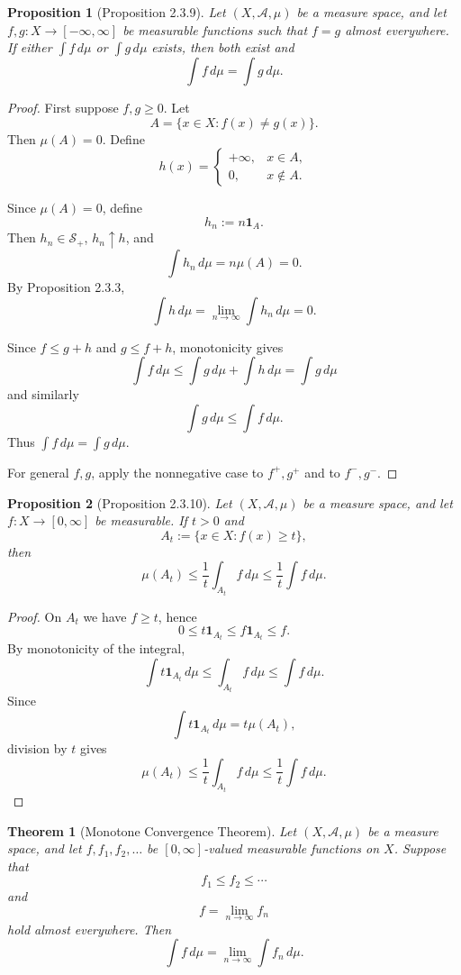 \documentclass[12pt]{article}
\newtheorem{theorem}{Theorem}
\newtheorem{proposition}{Proposition}
\begin{document}
\begin{proposition}[Proposition 2.3.9]
Let $(X,\mathcal{A},\mu)$ be a measure space, and let $f,g:X\to[-\infty,\infty]$
be measurable functions such that $f=g$ almost everywhere. If either
$\int f\,d\mu$ or $\int g\,d\mu$ exists, then both exist and
\[
\int f\,d\mu = \int g\,d\mu.
\]
\end{proposition}

\begin{proof}
First suppose $f,g\ge 0$. Let
\[
A=\{x\in X:f(x)\neq g(x)\}.
\]
Then $\mu(A)=0$. Define
\[
h(x)=
\begin{cases}
+\infty, & x\in A,\\
0, & x\notin A.
\end{cases}
\]

Since $\mu(A)=0$, define
\[
h_n := n\mathbf{1}_A.
\]
Then $h_n \in \mathcal{S}_+$, $h_n \uparrow h$, and
\[
\int h_n\,d\mu = n\mu(A)=0.
\]
By Proposition 2.3.3,
\[
\int h\,d\mu
=
\lim_{n\to\infty}\int h_n\,d\mu
=
0.
\]

Since $f\le g+h$ and $g\le f+h$, monotonicity gives
\[
\int f\,d\mu \le \int g\,d\mu+\int h\,d\mu=\int g\,d\mu
\]
and similarly
\[
\int g\,d\mu \le \int f\,d\mu.
\]
Thus $\int f\,d\mu=\int g\,d\mu$.

For general $f,g$, apply the nonnegative case to $f^+,g^+$ and to $f^-,g^-$.
\end{proof}

\begin{proposition}[Proposition 2.3.10]
Let $(X,\mathcal{A},\mu)$ be a measure space, and let
$f:X\to[0,\infty]$ be measurable. If $t>0$ and
\[
A_t:=\{x\in X:f(x)\ge t\},
\]
then
\[
\mu(A_t)
\le
\frac{1}{t}\int_{A_t} f\,d\mu
\le
\frac{1}{t}\int f\,d\mu.
\]
\end{proposition}

\begin{proof}
On $A_t$ we have $f\ge t$, hence
\[
0\le t\mathbf{1}_{A_t}\le f\mathbf{1}_{A_t}\le f.
\]
By monotonicity of the integral,
\[
\int t\mathbf{1}_{A_t}\,d\mu
\le
\int_{A_t} f\,d\mu
\le
\int f\,d\mu.
\]
Since
\[
\int t\mathbf{1}_{A_t}\,d\mu=t\mu(A_t),
\]
division by $t$ gives
\[
\mu(A_t)
\le
\frac{1}{t}\int_{A_t} f\,d\mu
\le
\frac{1}{t}\int f\,d\mu.
\]
\end{proof}

\begin{theorem}[Monotone Convergence Theorem]
Let $(X,\mathcal{A},\mu)$ be a measure space, and let
$f,f_1,f_2,\dots$ be $[0,\infty]$-valued measurable functions on $X$.
Suppose that
\[
f_1 \le f_2 \le \cdots
\]
and
\[
f = \lim_{n\to\infty} f_n
\]
hold almost everywhere. Then
\[
\int f\,d\mu = \lim_{n\to\infty} \int f_n\,d\mu.
\]
\end{theorem}
\end{document}
